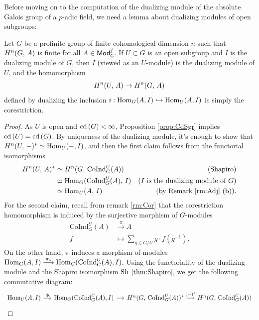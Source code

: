 \documentclass[a4paper, oneside]{memoir}
\begin{document}
Before moving on to the computation of the dualizing module of the absolute Galois group of a \(p\)-adic field, we need a lemma about dualizing modules of open subgroups:

\begin{lemma}\label{lm:DualOpenSgr}
	Let \(G\) be a profinite group of finite cohomological dimension \(n\) such that \(H^{n}( G, \, A )\) is finite for all \(A\in\mathsf{Mod}_{\mathsf{G}}^f\). If \(U\subset G\) is an open subgroup and \(I\) is the dualizing module of \(G\), then \(I\) (viewed as an \(U\)-module) is the dualizing module of \(U\), and the homomorphism
	\[
		H^{n}( U, \, A )\to H^{n}( G, \, A )
	\]
	defined by dualizing the inclusion \(i:\operatorname{Hom}_G(A,I) \hookrightarrow \operatorname{Hom}_U(A,I) \) is simply the corestriction.
\end{lemma}

\begin{proof}
	As \(U\) is open and \(\operatorname{cd}{(G)}<\infty\), Proposition \ref{prop:CdSgr} implies \(\operatorname{cd}{(U)}=\operatorname{cd}{(G)}\). By uniqueness of the dualizing module, it's enough to show that
	\(H^{n}( U, \, - )^*\simeq\operatorname{Hom}_U(-,I)\), and then the first claim follows from the functorial isomorphisms
	\begin{align*}
		H^{n}( U, \, A )^* & \simeq H^{n}( G, \, \mathrm{CoInd}_G^U(A) )   & \text{(Shapiro)}                            \\
		              & \simeq \operatorname{Hom}_G(\mathrm{CoInd}_G^U(A),\,I) & \text{($I$ is the dualizing module of $G$)} \\
		              & \simeq \operatorname{Hom}_U(A,\,I)                     & \text{(by Remark \eqref{rm:Adj} (b))}.
	\end{align*}
	For the second claim, recall from remark \ref{rm:Cor} that the corestriction homomorphism is induced by the surjective morphism of \(G\)-modules
	\begin{align*}
		\mathrm{CoInd}_G^U(A) & \overset{\pi}{\longrightarrow} A               \\
		f                     & \longmapsto \sum_{g\in G/U}{g\cdot f(g^{-1})}.
	\end{align*}
	On the other hand, $\pi$ induces a morphism of modules \(\operatorname{Hom}_G(A,I)\overset{\pi_*}{\longrightarrow}\operatorname{Hom}_G(\mathrm{CoInd}_G^U(A),I)\).
	Using the functoriality of the dualizing module and the Shapiro isomorphism $\operatorname{Sh}$ \eqref{thm:Shapiro},
	we get the following commutative diagram:
	\[
		\begin{tikzcd}[column sep=small, row sep=large]
			\Hom_U(A,I)
			\rar["\Phi"] &
			\Hom_G(\mathrm{CoInd}_G^U(A), I)
			\rar &
			\H{n}{G}{\mathrm{CoInd}_G^U(A)}^*
			\rar["(-)^*"]&\H{n}{G}{\mathrm{CoInd}_G^U(A)}

\end{tikzcd}\]
\end{proof}
\end{document}
